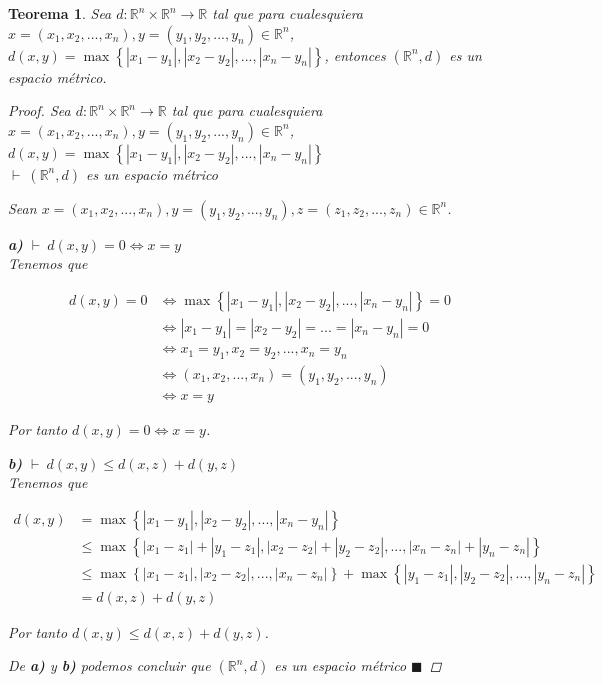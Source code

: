 \documentclass[oneside]{book} %
\theoremstyle{Teorema}
\newtheorem{Teorema}[Definicion]{Teorema}
\theoremstyle{Ejemplos}
\theoremstyle{[Obs]}
\newcommand{\abs}[1]{\left|#1\right|} %
\renewcommand{\{}{\left\lbrace} %
\renewcommand{\}}{\right\rbrace} %
\newcommand{\R}{\mathbb{R}} %
\newcommand{\Rn}{\mathbb{R}^n} %
\renewcommand{\qed}{$\blacksquare$} %
\newcommand{\pd}{$\vdash\ $} %
\begin{document}
			\begin{Teorema}\setlength{\parindent}{0em}
			
				Sea $d : \Rn \times \Rn \to \R$ tal que para cualesquiera $x = (x_1, x_2, ..., x_n), y = (y_1, y_2, ..., y_n) \in \Rn$, $d(x, y) = \max\{ \abs{x_1 - y_1}, \abs{x_2 - y_2}, ..., \abs{x_n - y_n} \}$, entonces $(\Rn, d)$ es un espacio métrico.

				\begin{proof}
					
					Sea $d : \Rn \times \Rn \to \R$ tal que para cualesquiera $x = (x_1, x_2, ..., x_n), y = (y_1, y_2, ..., y_n) \in \Rn$, $d(x, y) = \max\{ \abs{x_1 - y_1}, \abs{x_2 - y_2}, ..., \abs{x_n - y_n} \}$ \\ 
					\pd $(\Rn, d)$ es un espacio métrico

					Sean $x = (x_1, x_2, ..., x_n), y = (y_1, y_2, ..., y_n), z = (z_1, z_2, ..., z_n) \in \Rn$.

					\textbf{a)} \pd $d(x, y) = 0 \Leftrightarrow x = y$ \\ 
					Tenemos que 

					\begin{align*}
						d(x, y) = 0 & \Leftrightarrow \max\{ \abs{x_1 - y_1}, \abs{x_2 - y_2}, ..., \abs{x_n - y_n} \} = 0 \\ 
						& \Leftrightarrow \abs{x_1 - y_1} = \abs{x_2 - y_2} = ... = \abs{x_n - y_n} = 0 \\ 
						& \Leftrightarrow x_1 = y_1, x_2 = y_2, ..., x_n = y_n \\ 
						& \Leftrightarrow (x_1, x_2, ..., x_n) = (y_1, y_2, ..., y_n) \\ 
						& \Leftrightarrow x = y
					\end{align*}

					Por tanto $d(x, y) = 0 \Leftrightarrow x = y$.

					\textbf{b)} \pd $d(x, y) \leq d(x, z) + d(y, z)$ \\ 
					Tenemos que 

					\begin{align*}
						d(x, y) &= \max\{ \abs{x_1 - y_1}, \abs{x_2 - y_2}, ..., \abs{x_n - y_n} \} \\ 
						&\leq \max\{ \abs{x_1 - z_1} + \abs{y_1 - z_1}, \abs{x_2 - z_2} + \abs{y_2 - z_2}, ..., \abs{x_n - z_n} + \abs{y_n - z_n} \} \\ 
						&\leq \max\{ \abs{x_1 - z_1}, \abs{x_2 - z_2}, ..., \abs{x_n - z_n} \} + \max\{ \abs{y_1 - z_1}, \abs{y_2 - z_2}, ..., \abs{y_n - z_n} \} \\ 
						&= d(x, z) + d(y, z)
					\end{align*}

					Por tanto $d(x, y) \leq d(x, z) + d(y, z)$.

					De \textbf{a)} y \textbf{b)} podemos concluir que $(\Rn, d)$ es un espacio métrico \qed

				\end{proof}
			
			\end{Teorema}
\end{document}
